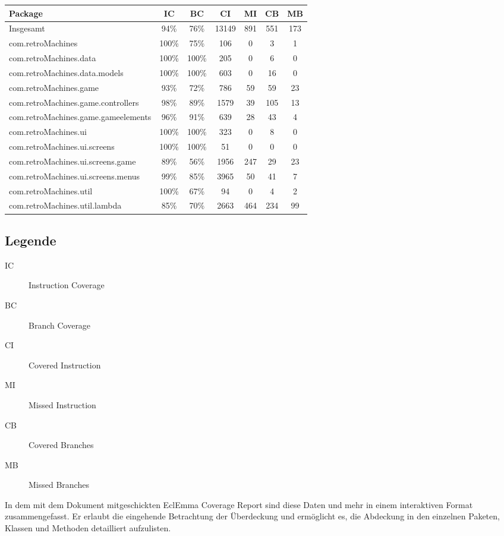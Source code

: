 \documentclass[parskip=full]{scrreprt}
\begin{document}
\begin{tabular} { | l | c | c | c | c | c | c | }
	\hline
	\textbf{Package} & \textbf{IC} & \textbf{BC} & \textbf{CI} & \textbf{MI} & \textbf{CB} & \textbf{MB} \\
	\hline
	Insgesamt & 94\% & 76\% & 13149 & 891 & 551 & 173 \\
	\hline
	com.retroMachines & 100\% & 75\% & 106 & 0 & 3 & 1 \\
	\hline
	com.retroMachines.data & 100\% & 100\% & 205 & 0 & 6 & 0  \\
	\hline
	com.retroMachines.data.models & 100\% & 100\% & 603 & 0 & 16 & 0 \\
	\hline
	com.retroMachines.game & 93\% & 72\% & 786 & 59 & 59 & 23 \\
	\hline
	com.retroMachines.game.controllers & 98\% & 89\% & 1579 & 39 & 105 & 13 \\
	\hline
	com.retroMachines.game.gameelements & 96\% & 91\% & 639 & 28 & 43 & 4 \\
	\hline
	com.retroMachines.ui & 100\% & 100\% & 323 & 0 & 8 & 0 \\
	\hline
	com.retroMachines.ui.screens & 100\% & 100\% & 51 & 0 & 0 & 0 \\
	\hline
	com.retroMachines.ui.screens.game & 89\% & 56\% & 1956 & 247 & 29 & 23 \\
	\hline
	com.retroMachines.ui.screens.menus & 99\% & 85\% & 3965 & 50 & 41 & 7 \\
	\hline
	com.retroMachines.util & 100\% & 67\% & 94 & 0 & 4 & 2 \\
	\hline
	com.retroMachines.util.lambda & 85\% & 70\% & 2663 & 464 & 234 & 99\\
	\hline
\end{tabular}

\subsection*{Legende}
\begin{description}
	\item[IC] Instruction Coverage
	\item[BC] Branch Coverage
	\item[CI] Covered Instruction
	\item[MI] Missed Instruction
	\item[CB] Covered Branches
	\item[MB] Missed Branches
\end{description}	

In dem mit dem Dokument mitgeschickten EclEmma Coverage Report sind diese Daten und mehr in einem interaktiven Format zusammengefasst. 
Er erlaubt die eingehende Betrachtung der Überdeckung und ermöglicht es, die Abdeckung in den einzelnen Paketen, Klassen und Methoden detailliert aufzulisten.
\end{document}
